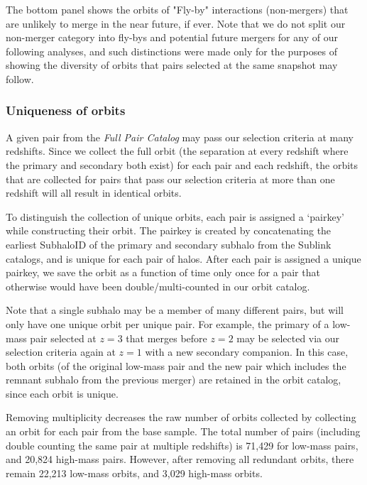 \documentclass[twocolumn,linenumbers]{aastex631}
\newcommand{\paircat}{\textit{Full Pair Catalog}}
\begin{document}
The bottom panel shows the orbits of "Fly-by" interactions (non-mergers) that are unlikely to merge in the near future, if ever.  
Note that we do not split our non-merger category into fly-bys and potential future mergers for any of our following analyses, and such distinctions were made only for the purposes of showing the diversity of orbits that pairs selected at the same snapshot may follow.


\subsubsection{Uniqueness of orbits}
A given pair from the \paircat{} may pass our selection criteria at many redshifts. 
Since we collect the full orbit (the separation at every redshift where the primary and secondary both exist) for each pair and each redshift, the orbits that are collected for pairs that pass our selection criteria at more than one redshift will all result in identical orbits. 

To distinguish the collection of unique orbits, each pair is assigned a `pairkey' while constructing their orbit. 
The pairkey is created by concatenating the earliest SubhaloID of the primary and secondary subhalo from the Sublink catalogs, and is unique for each pair of halos. 
After each pair is assigned a unique pairkey, we save the orbit as a function of time only once for a pair that otherwise would have been double/multi-counted in our orbit catalog.

Note that a single subhalo may be a member of many different pairs, but will only have one unique orbit per unique pair.
For example, the primary of a low-mass pair selected at $z=3$ that merges before $z=2$ may be selected via our selection criteria again at $z=1$ with a new secondary companion. 
In this case, both orbits (of the original low-mass pair and the new pair which includes the remnant subhalo from the previous merger) are retained in the orbit catalog, since each orbit is unique.

Removing multiplicity decreases the raw number of orbits collected by collecting an orbit for each pair from the base sample. 
The total number of pairs (including double counting the same pair at multiple redshifts) is 71,429 for low-mass pairs, and 20,824 high-mass pairs. 
However, after removing all redundant orbits, there remain 22,213 low-mass orbits, and 3,029 high-mass orbits.
\end{document}
